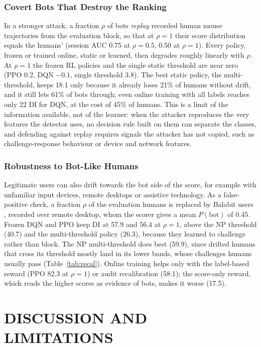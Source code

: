 \documentclass{ieeetj}
\begin{document}
\vspace{-15pt}
\subsubsection{Covert Bots That Destroy the Ranking}
In a stronger attack, a fraction $\rho$ of bots \emph{replay} recorded human mouse trajectories from the evaluation block, so that at $\rho=1$ their score distribution equals the humans' (session AUC 0.75 at $\rho=0.5$, 0.50 at $\rho=1$).
Every policy, frozen or trained online, static or learned, then degrades roughly linearly with $\rho$. At $\rho=1$ the frozen RL policies and the single static threshold are near zero (PPO 0.2, DQN $-0.1$, single threshold 3.8). The best static policy, the multi-threshold, keeps 18.1 only because it already loses 21\% of humans without drift, and it still lets 61\% of bots through; even online training with all labels reaches only 22 DI for DQN, at the cost of 45\% of humans.
This is a limit of the information available, not of the learner: when the attacker reproduces the very features the detector uses, no decision rule built on them can separate the classes, and defending against replay requires signals the attacker has not copied, such as challenge-response behaviour or device and network features.

\vspace{-15pt}
\subsubsection{Robustness to Bot-Like Humans}
Legitimate users can also drift towards the bot side of the score, for example with unfamiliar input devices, remote desktops or assistive technology.
As a false-positive check, a fraction $\rho$ of the evaluation humans is replaced by Balabit users \cite{balabit_2016}, recorded over remote desktop, whom the scorer gives a mean $P(\text{bot})$ of 0.45.
Frozen DQN and PPO keep DI at 57.9 and 56.4 at $\rho=1$, above the NP threshold (40.7) and the multi-threshold policy (26.3), because they learned to challenge rather than block. 
The NP multi-threshold does best (59.9), since drifted humans that cross its threshold mostly land in its lower bands, whose challenges humans usually pass (Table~\ref{tab:recal}).
Online training helps only with the label-based reward (PPO 82.3 at $\rho=1$) or audit recalibration (58.1); the score-only reward, which reads the higher scores as evidence of bots, makes it worse (17.5).

\section{DISCUSSION AND LIMITATIONS}
\end{document}
